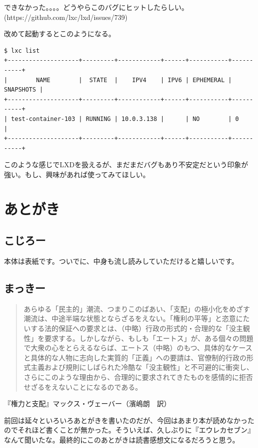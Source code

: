 ﻿\documentclass[9pt,b5paper,tombo,openany]{jsbook}
\begin{document}
\noindent
できなかった。。。。どうやらこのバグにヒットしたらしい。(https://github.com/lxc/lxd/issues/739)

\noindent
改めて起動するとこのようになる。
\begin{lstlisting}
$ lxc list
+--------------------+---------+------------+------+-----------+-----------+
|        NAME        |  STATE  |    IPV4    | IPV6 | EPHEMERAL | SNAPSHOTS |
+--------------------+---------+------------+------+-----------+-----------+
| test-container-103 | RUNNING | 10.0.3.138 |      | NO        | 0         |
+--------------------+---------+------------+------+-----------+-----------+
\end{lstlisting}

\noindent
このような感じでLXDを扱えるが、まだまだバグもあり不安定だという印象が強い。もし、興味があれば使ってみてほしい。

\chapter{あとがき}

\section*{こじろー}
本体は表紙です。ついでに、中身も流し読みしていただけると嬉しいです。

\section*{まっきー}

\begin{quote}
あらゆる「民主的」潮流、つまりこのばあい、「支配」の極小化をめざす潮流は、中途半端な状態とならざるをえない。「権利の平等」と恣意にたいする法的保証への要求とは、（中略）行政の形式的・合理的な「没主観性」を要求する。しかしながら、もしも「エートス」が、ある個々の問題で大衆の心をとらえるならば、エートス（中略）のもつ、具体的なケースと具体的な人物に志向した実質的「正義」への要請は、官僚制的行政の形式主義および規則にしばられた冷酷な「没主観性」と不可避的に衝突し、さらにこのような理由から、合理的に要求されてきたものを感情的に拒否せざるをえないことになるのである。
\end{quote}

\begin{flushright}
『権力と支配』マックス・ヴェーバー（濱嶋朗　訳）
\end{flushright}

前回は延々といろいろあとがきを書いたのだが、今回はあまり本が読めなかったのでそれほど書くことが無かった。そういえば、久しぶりに『エウレカセブン』なんて聞いたな。最終的にこのあとがきは読書感想文になるだろうと思う。
\end{document}
